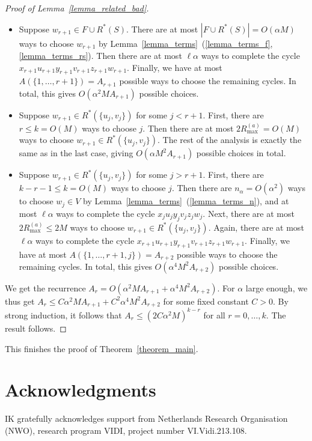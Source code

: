 \documentclass{article}
\theoremstyle{plain}
\theoremstyle{remark}
\theoremstyle{plain}
\numberwithin{equation}{section}
\begin{document}
\begin{proof}[Proof of Lemma~\ref{lemma_related_bad}]
		\begin{itemize}
			\item Suppose $w_{r+1}\in F\cup R^*(S)$. There are at most $|F\cup R^*(S)|=O(\alpha M)$ ways to choose $w_{r+1}$ by Lemma~\ref{lemma_terms}~(\ref{lemma_terms_f},\ref{lemma_terms_rs}). Then there are at most $\ell\alpha$ ways to complete the cycle $x_{r+1}u_{r+1}y_{r+1}v_{r+1}z_{r+1}w_{r+1}$. Finally, we have at most $A(\{1,\ldots,r+1\})=A_{r+1}$ possible ways to choose the remaining cycles. In total, this gives $O(\alpha^2MA_{r+1})$ possible choices.
			\item Suppose $w_{r+1}\in R^*(\{u_j,v_j\})$ for some $j<r+1$. First, there are $r\leq k=O(M)$ ways to choose $j$. Then there are at most $2R_{\max}^{(a)}=O(M)$ ways to choose $w_{r+1}\in R^*(\{u_j,v_j\})$. The rest of the analysis is exactly the same as in the last case, giving $O(\alpha M^2A_{r+1})$ possible choices in total.
			\item Suppose $w_{r+1}\in R^*(\{u_j,v_j\})$ for some $j>r+1$. First, there are $k-r-1\leq k=O(M)$ ways to choose $j$. Then there are $n_{\alpha}=O(\alpha^2)$ ways to choose $w_j\in V$ by Lemma~\ref{lemma_terms}~(\ref{lemma_terms_n}), and at most $\ell\alpha$ ways to complete the cycle $x_ju_jy_jv_jz_jw_j$. Next, there are at most $2R_{\max}^{(a)}\leq2M$ ways to choose $w_{r+1}\in R^*(\{u_j,v_j\})$. Again, there are at most $\ell\alpha$ ways to complete the cycle $x_{r+1}u_{r+1}y_{r+1}v_{r+1}z_{r+1}w_{r+1}$. Finally, we have at most $A(\{1,\ldots,r+1,j\})=A_{r+2}$ possible ways to choose the remaining cycles. In total, this gives $O(\alpha^4M^2A_{r+2})$ possible choices.
		\end{itemize}
		
		We get the recurrence $A_r=O(\alpha^2MA_{r+1}+\alpha^4M^2A_{r+2})$. For $\alpha$ large enough, we thus get $A_r\leq C\alpha^2MA_{r+1}+C^2\alpha^4M^2A_{r+2}$ for some fixed constant $C>0$. By strong induction, it follows that $A_r\leq(2C\alpha^2M)^{k-r}$ for all $r=0,\ldots,k$. The result follows.
	\end{proof}
	
	This finishes the proof of Theorem~\ref{theorem_main}.
	
	\section*{Acknowledgments}
	IK gratefully acknowledges support from Netherlands Research Organisation (NWO), research program VIDI, project number VI.Vidi.213.108.
	
	\printbibliography
	
	
\end{document}
